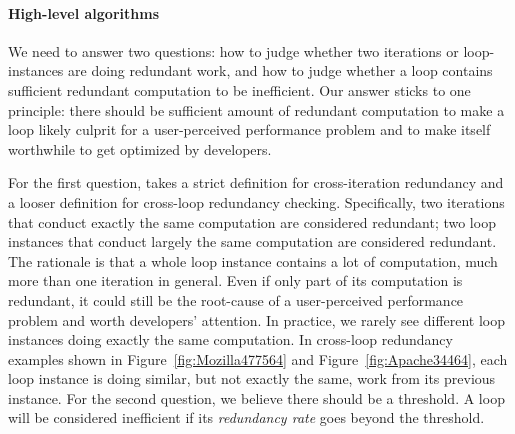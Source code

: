 \paragraph{High-level algorithms}
We need to answer two questions:
how to judge whether
two iterations or loop-instances are doing redundant work, and
how to judge whether a loop contains sufficient redundant
computation to be inefficient.
Our answer sticks to one principle: there should be
sufficient amount of redundant computation to make a loop likely culprit
for a user-perceived performance problem and to make itself worthwhile to
get optimized by developers. 

For the first question, \Tool takes a strict 
definition for cross-iteration redundancy and a looser definition for
cross-loop redundancy checking. Specifically,
two iterations that conduct exactly the same computation are
considered redundant; two loop instances that conduct largely
the same computation are considered redundant.
The rationale is that 
a whole loop instance contains a lot of computation, much more than
one iteration in general. Even if only part of its computation
is redundant, it could still be the root-cause of a user-perceived performance
problem and worth developers' attention. 
In practice, we rarely see different loop 
instances doing exactly the same computation.
In cross-loop redundancy examples shown in 
Figure~\ref{fig:Mozilla477564} and
Figure~\ref{fig:Apache34464}, each loop instance is doing similar, but not
exactly the same, work from its previous instance.
For the second question, we believe there should be a threshold. 
A loop will be considered inefficient if its \textit{redundancy rate} goes
beyond the threshold.






